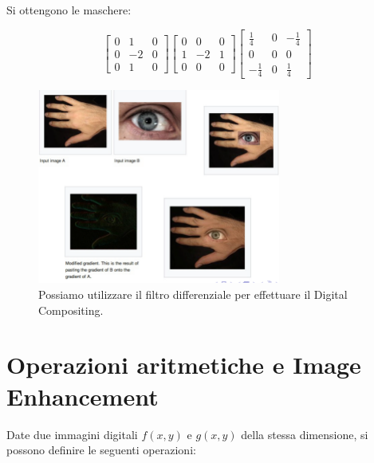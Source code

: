 Si ottengono le maschere:
\begin{center}
    \[
        \begin{bmatrix}
            0 & 1  & 0 \\
            0 & -2 & 0 \\
            0 & 1  & 0
        \end{bmatrix}
        \begin{bmatrix}
            0 & 0  & 0 \\
            1 & -2 & 1 \\
            0 & 0  & 0
        \end{bmatrix}
        \begin{bmatrix}
            \frac{1}{4}  & 0 & -\frac{1}{4} \\
            0            & 0 & 0            \\
            -\frac{1}{4} & 0 & \frac{1}{4}
        \end{bmatrix}
    \]
\end{center}

\begin{figure}[H]
    \centering
    \includegraphics[width=8cm, keepaspectratio]{capitoli/immagini/imgs/digital-composing.png}
    \caption{Possiamo utilizzare il filtro differenziale per effettuare il Digital Compositing.}
\end{figure}

\section{Operazioni aritmetiche e Image Enhancement}

Date due immagini digitali $f(x,y)$ e $g(x,y)$ della stessa dimensione, si
possono definire le seguenti operazioni:


